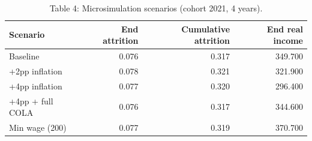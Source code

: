 \begin{table}
\caption{Table 4: Microsimulation scenarios (cohort 2021, 4 years).}
\label{tab:table4_scenarios}
\begin{tabular}{lrrr}
\toprule
Scenario & End attrition & Cumulative attrition & End real income \\
\midrule
Baseline & 0.076 & 0.317 & 349.700 \\
+2pp inflation & 0.078 & 0.321 & 321.900 \\
+4pp inflation & 0.077 & 0.320 & 296.400 \\
+4pp + full COLA & 0.076 & 0.317 & 344.600 \\
Min wage (200) & 0.077 & 0.319 & 370.700 \\
\bottomrule
\end{tabular}
\end{table}
